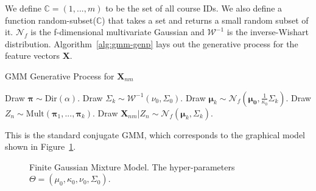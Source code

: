 \documentclass[10pt]{proc}
\begin{document}
We define $\mathbb{C} = (1, ..., m)$ to be the set of all course IDs. We also
define a function random-subset($\mathbb{C}$) that takes a set and returns a
small random subset of it. $\mathcal{N}_f$ is the f-dimensional multivariate
Gaussian and $\mathcal{W}^{-1}$ is the inverse-Wishart distribution.
Algorithm~\ref{alg:gmm-genp} lays out the generative process for the feature
vectors $\bm{X}$.
%
\begin{algorithm}
    \caption{GMM Generative Process for $\bm{X}_{nm}$}
    \label{alg:gmm-genp}
    \begin{algorithmic}[1]
        \item  Draw $\bm{\pi} \sim \text{Dir}(\alpha)$.
            \State  Draw $\Sigma_k \sim \mathcal{W}^{-1}(\nu_0, \Sigma_0)$.
            \State  Draw $\bm{\mu}_k \sim
                \mathcal{N}_f(\bm{\mu_0}, \frac{1}{\kappa_0}\Sigma_k)$.
        \EndFor
            \State  Draw $Z_n \sim \text{Mult}(\bm{\pi}_1, ..., \bm{\pi}_k)$.
                \State  Draw $\bm{X}_{nm} | Z_n \sim \mathcal{N}_f(\bm{\mu}_k, \Sigma_k)$.
            \EndFor
        \EndFor
    \end{algorithmic}
\end{algorithm}
%
This is the standard conjugate GMM, which corresponds to the graphical model
shown in Figure~\ref{fig:gmm-pgm}.

\begin{figure}[tbh]
  \setlength{\belowcaptionskip}{15pt plus 3pt minus 2pt}
  \centering
  \caption{Finite Gaussian Mixture Model. The hyper-parameters
           $\Theta = (\mu_0, \kappa_0, \nu_0, \Sigma_0)$. }
  \label{fig:gmm-pgm}
\end{figure}
\end{document}
